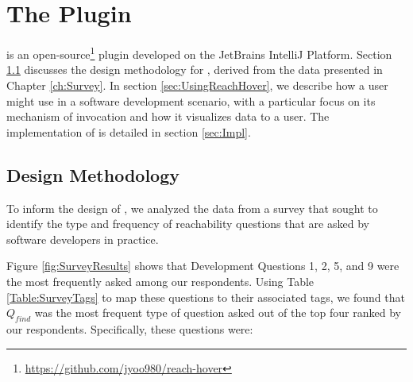 
\chapter{The \toolname{} Plugin}
\label{ch:Tool}


\noindent \toolname{} is an open-source\footnote{\url{https://github.com/jyoo980/reach-hover}}
plugin developed on the JetBrains IntelliJ Platform.
Section \ref{sec:DesignMeth} discusses the design methodology for \toolname{},
derived from the data presented in Chapter \ref{ch:Survey}.
In section \ref{sec:UsingReachHover}, we describe how a user might use
\toolname{} in a software development scenario, with a particular focus on
its mechanism of invocation and how it visualizes data to a user.
The implementation of \toolname{} is detailed in section
\ref{sec:Impl}.

\section{Design Methodology}
\label{sec:DesignMeth}

\noindent To inform the design of \toolname{}, we analyzed the data from a 
survey that sought to identify the type and frequency of reachability questions 
that are asked by software developers in practice.

Figure \ref{fig:SurveyResults} shows that Development Questions 1, 2, 5, and 9
were the most frequently asked among our respondents.
Using Table \ref{Table:SurveyTags} to map these questions to their associated
tags, we found that $Q_{find}$ was the most frequent type of question asked out
of the top four ranked by our respondents.
Specifically, these questions were:

\noindent{}

